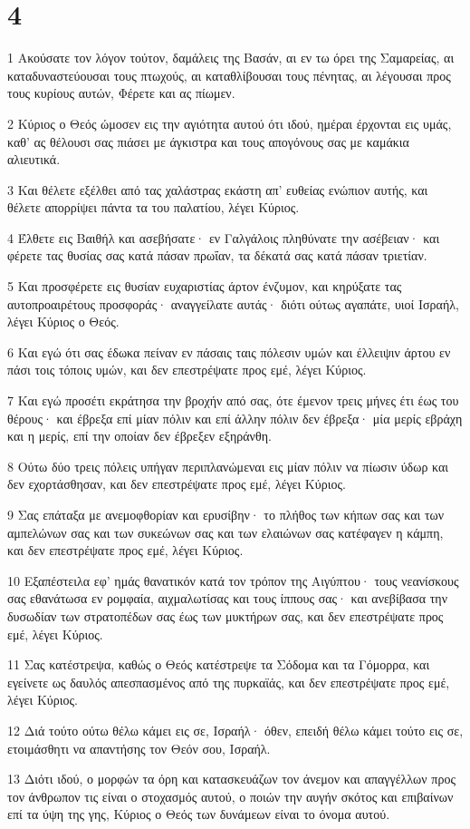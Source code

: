 \chapter{4}

\par 1 Ακούσατε τον λόγον τούτον, δαμάλεις της Βασάν, αι εν τω όρει της Σαμαρείας, αι καταδυναστεύουσαι τους πτωχούς, αι καταθλίβουσαι τους πένητας, αι λέγουσαι προς τους κυρίους αυτών, Φέρετε και ας πίωμεν.
\par 2 Κύριος ο Θεός ώμοσεν εις την αγιότητα αυτού ότι ιδού, ημέραι έρχονται εις υμάς, καθ' ας θέλουσι σας πιάσει με άγκιστρα και τους απογόνους σας με καμάκια αλιευτικά.
\par 3 Και θέλετε εξέλθει από τας χαλάστρας εκάστη απ' ευθείας ενώπιον αυτής, και θέλετε απορρίψει πάντα τα του παλατίου, λέγει Κύριος.
\par 4 Έλθετε εις Βαιθήλ και ασεβήσατε· εν Γαλγάλοις πληθύνατε την ασέβειαν· και φέρετε τας θυσίας σας κατά πάσαν πρωΐαν, τα δέκατά σας κατά πάσαν τριετίαν.
\par 5 Και προσφέρετε εις θυσίαν ευχαριστίας άρτον ένζυμον, και κηρύξατε τας αυτοπροαιρέτους προσφοράς· αναγγείλατε αυτάς· διότι ούτως αγαπάτε, υιοί Ισραήλ, λέγει Κύριος ο Θεός.
\par 6 Και εγώ ότι σας έδωκα πείναν εν πάσαις ταις πόλεσιν υμών και έλλειψιν άρτου εν πάσι τοις τόποις υμών, και δεν επεστρέψατε προς εμέ, λέγει Κύριος.
\par 7 Και εγώ προσέτι εκράτησα την βροχήν από σας, ότε έμενον τρεις μήνες έτι έως του θέρους· και έβρεξα επί μίαν πόλιν και επί άλλην πόλιν δεν έβρεξα· μία μερίς εβράχη και η μερίς, επί την οποίαν δεν έβρεξεν εξηράνθη.
\par 8 Ούτω δύο τρεις πόλεις υπήγαν περιπλανώμεναι εις μίαν πόλιν να πίωσιν ύδωρ και δεν εχορτάσθησαν, και δεν επεστρέψατε προς εμέ, λέγει Κύριος.
\par 9 Σας επάταξα με ανεμοφθορίαν και ερυσίβην· το πλήθος των κήπων σας και των αμπελώνων σας και των συκεώνων σας και των ελαιώνων σας κατέφαγεν η κάμπη, και δεν επεστρέψατε προς εμέ, λέγει Κύριος.
\par 10 Εξαπέστειλα εφ' ημάς θανατικόν κατά τον τρόπον της Αιγύπτου· τους νεανίσκους σας εθανάτωσα εν ρομφαία, αιχμαλωτίσας και τους ίππους σας· και ανεβίβασα την δυσωδίαν των στρατοπέδων σας έως των μυκτήρων σας, και δεν επεστρέψατε προς εμέ, λέγει Κύριος.
\par 11 Σας κατέστρεψα, καθώς ο Θεός κατέστρεψε τα Σόδομα και τα Γόμορρα, και εγείνετε ως δαυλός απεσπασμένος από της πυρκαϊάς, και δεν επεστρέψατε προς εμέ, λέγει Κύριος.
\par 12 Διά τούτο ούτω θέλω κάμει εις σε, Ισραήλ· όθεν, επειδή θέλω κάμει τούτο εις σε, ετοιμάσθητι να απαντήσης τον Θεόν σου, Ισραήλ.
\par 13 Διότι ιδού, ο μορφών τα όρη και κατασκευάζων τον άνεμον και απαγγέλλων προς τον άνθρωπον τις είναι ο στοχασμός αυτού, ο ποιών την αυγήν σκότος και επιβαίνων επί τα ύψη της γης, Κύριος ο Θεός των δυνάμεων είναι το όνομα αυτού.

